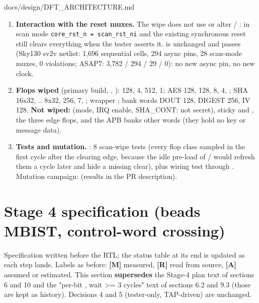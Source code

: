 \begin{relocated}{docs/design/DFT_ARCHITECTURE.md}
\begin{enumerate}
\item
  \textbf{Interaction with the reset muxes.} The wipe does not use or
  alter  / : in scan mode
  \texttt{core\_\allowbreak{}rst\_\allowbreak{}n\ =\allowbreak{}\ scan\_\allowbreak{}rst\_\allowbreak{}ni}
  and the existing synchronous reset still clears everything when the
  tester asserts it.  is unchanged and
  passes (Sky130 sv2v netlist: 1,696 sequential cells, 294 async pins,
  28 scan-mode muxes, 0 violations; ASAP7: 3,782 / 294 / 29 / 0): no new
  async pin, no new clock.
\item
  \textbf{Flops wiped} (primary build, ,
  ):  128,  4,
   512,  1; AES  128, 
  128,  8,  4, ; SHA 
  16x32, .. 8x32,  256,  7,
  ; wrapper ; bank words DOUT 128, DIGEST
  256, IV 128. \textbf{Not wiped:}  (mode, IRQ enable,
  SHA\_CONT: not secret), sticky  and
  , the three edge flops, and the APB
  bank\textquotesingle s other words (they hold no key or message data).
\item
  \textbf{Tests and mutation.} : 8 scan-wipe tests
  (every flop class sampled in the first cycle after the clearing edge,
  because the idle pre-load of / would refresh them
  a cycle later and hide a missing clear), plus
   wiring test through .
  Mutation campaign: 
  (results in the PR description).
\end{enumerate}

\section{\texorpdfstring{Stage 4 specification (beads 
MBIST,  control-word
crossing)}{Stage 4 specification (beads  MBIST,  control-word crossing)}}\label{tm:ch:dft-architecture:16-stage-4-specification-beads-j41m14-mbist-j41m10-control-word-crossing}

Specification written before the RTL; the status table at its end is
updated as each step lands. Labels as before: \textbf{{[}M{]}} measured,
\textbf{{[}R{]}} read from source, \textbf{{[}A{]}} assumed or
estimated. This section \textbf{supersedes} the Stage-4 plan text of
sections 6 and 10 and the "per-bit , wait \textgreater= 3
cycles" text of sections 6.2 and 9.3 (those are kept as history).
Decisions 4 and 5 (tester-only, TAP-driven) are unchanged.


\end{relocated}
